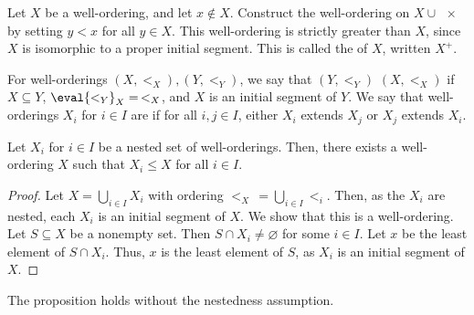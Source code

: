 Let $X$ be a well-ordering, and let $x \not\in X$.
Construct the well-ordering on $X \cup \qty{x}$ by setting $y < x$ for all $y \in X$.
This well-ordering is strictly greater than $X$, since $X$ is isomorphic to a proper initial segment.
This is called the  of $X$, written $X^+$.

For well-orderings $(X, <_X), (Y, <_Y)$, we say that $(Y, <_Y)$  $(X, <_X)$ if $X \subseteq Y$, $\eval{<_Y}_{X} =\, <_X$, and $X$ is an initial segment of $Y$.
We say that well-orderings $X_i$ for $i \in I$ are  if for all $i, j \in I$, either $X_i$ extends $X_j$ or $X_j$ extends $X_i$.
\begin{proposition}
    Let $X_i$ for $i \in I$ be a nested set of well-orderings.
    Then, there exists a well-ordering $X$ such that $X_i \leq X$ for all $i \in I$.
\end{proposition}
\begin{proof}
    Let $X = \bigcup_{i \in I} X_i$ with ordering $<_X\, = \bigcup_{i \in I} <_i$.
    Then, as the $X_i$ are nested, each $X_i$ is an initial segment of $X$.
    We show that this is a well-ordering.
    Let $S \subseteq X$ be a nonempty set.
    Then $S \cap X_i \neq \varnothing$ for some $i \in I$.
    Let $x$ be the least element of $S \cap X_i$.
    Thus, $x$ is the least element of $S$, as $X_i$ is an initial segment of $X$.
\end{proof}
\begin{remark}
    The proposition holds without the nestedness assumption.
\end{remark}

